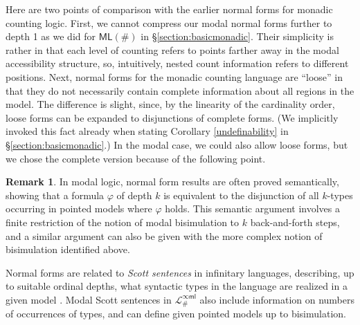 \documentclass[12pt,oneside,reqno]{amsart}
\theoremstyle{definition}
\newtheorem{remark}{Remark}
\begin{document}
Here are two points of comparison with the earlier normal forms for monadic counting logic. First, we cannot compress our modal  normal forms further to depth 1 as we did for $\mathsf{ML}(\#)$ in \S\ref{section:basicmonadic}. Their simplicity is rather in that each level of counting refers to points farther away in the modal accessibility structure, so, intuitively, nested count information refers to different positions. Next, normal forms for the monadic counting language are ``loose'' in that they do not necessarily contain complete information about all regions in the model. The difference is slight, since, by the linearity of the cardinality order,  loose forms can be expanded to disjunctions of complete forms. (We implicitly invoked this fact already when stating Corollary \ref{undefinability} in \S\ref{section:basicmonadic}.) In the modal case, we could also allow loose forms, but we chose the complete version because of the following point.



\begin{remark} In modal logic, normal form results are often proved semantically, showing that a formula $\varphi$  of depth $k$ is equivalent to the disjunction of all $k$-types occurring in pointed models where $\varphi$ holds. This semantic argument involves a finite restriction of the notion of modal bisimulation to $k$ back-and-forth steps, and a similar argument can also be given with the more complex notion of bisimulation identified above.

\end{remark}

Normal forms are  related to \emph{Scott sentences} in infinitary languages, describing, up to suitable ordinal depths,  what syntactic types in the language are realized in a given model \citep{Scott1965}. Modal Scott sentences in $\mathcal{L}_\#^{\infty\mathsf{ml}}$  also include information on numbers of occurrences of types, and can define given pointed models up to bisimulation.

\end{document}
